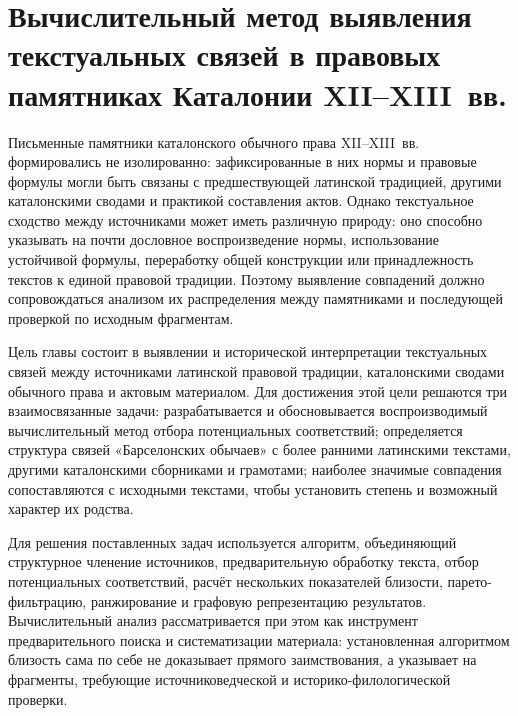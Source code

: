 
\chapter{Вычислительный метод выявления текстуальных связей в правовых памятниках Каталонии XII--XIII~вв.}

Письменные памятники каталонского обычного права XII--XIII~вв. формировались не изолированно: зафиксированные в них нормы и правовые формулы могли быть связаны с предшествующей латинской традицией, другими каталонскими сводами и практикой составления актов. Однако текстуальное сходство между источниками может иметь различную природу: оно способно указывать на почти дословное воспроизведение нормы, использование устойчивой формулы, переработку общей конструкции или принадлежность текстов к единой правовой традиции. Поэтому выявление совпадений должно сопровождаться анализом их распределения между памятниками и последующей проверкой по исходным фрагментам.

Цель главы состоит в выявлении и исторической интерпретации текстуальных связей между источниками латинской правовой традиции, каталонскими сводами обычного права и актовым материалом. Для достижения этой цели решаются три взаимосвязанные задачи: разрабатывается и обосновывается воспроизводимый вычислительный метод отбора потенциальных соответствий; определяется структура связей «Барселонских обычаев» с более ранними латинскими текстами, другими каталонскими сборниками и грамотами; наиболее значимые совпадения сопоставляются с исходными текстами, чтобы установить степень и возможный характер их родства.

Для решения поставленных задач используется алгоритм, объединяющий структурное членение источников, предварительную обработку текста, отбор потенциальных соответствий, расчёт нескольких показателей близости, парето-фильтрацию, ранжирование и графовую репрезентацию результатов. Вычислительный анализ рассматривается при этом как инструмент предварительного поиска и систематизации материала: установленная алгоритмом близость сама по себе не доказывает прямого заимствования, а указывает на фрагменты, требующие источниковедческой и историко-филологической проверки.

